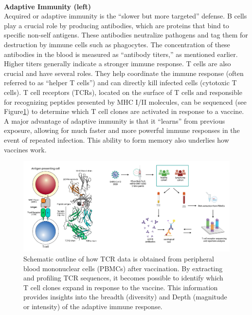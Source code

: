 \documentclass[12pt,a4paper]{report}
\begin{document}
\\
\textbf{Adaptive Immunity (left)}\\
Acquired or adaptive immunity is the “slower but more targeted” defense. B cells play a crucial role by producing antibodies, which are proteins that bind to specific non-self antigens. These antibodies neutralize pathogens and tag them for destruction by immune cells such as phagocytes.
The concentration of these antibodies in the blood is measured as “antibody titers,” as mentioned earlier. Higher titers generally indicate a stronger immune response. T cells are also crucial and have several roles. They help coordinate the immune response (often referred to as “helper T cells”) and can directly kill infected cells (cytotoxic T cells). T cell receptors (TCRs), located on the surface of T cells and responsible for recognizing peptides presented by MHC I/II molecules, can be sequenced (see Figure\ref{fig:TCR_profiling}) to determine which T cell clones are activated in response to a vaccine. A major advantage of adaptive immunity is that it “learns” from previous exposure, allowing for much faster and more powerful immune responses in the event of repeated infection. This ability to form memory also underlies how vaccines work. \cite{janeway2001immunobiology}

\begin{figure}[h]
  \centering
  \includegraphics[width=1\textwidth]{images/TCR_profiling.png}
  \caption[ TCR sequencing Workflow]{Schematic outline of how TCR data is obtained from peripheral blood mononuclear cells (PBMCs) after vaccination. By extracting and profiling TCR sequences, it becomes possible to identify which T cell clones expand in response to the vaccine. This information provides insights into the breadth (diversity) and Depth (magnitude or intensity) of the adaptive immune response.}
  \label{fig:TCR_profiling}
\end{figure}
\end{document}
